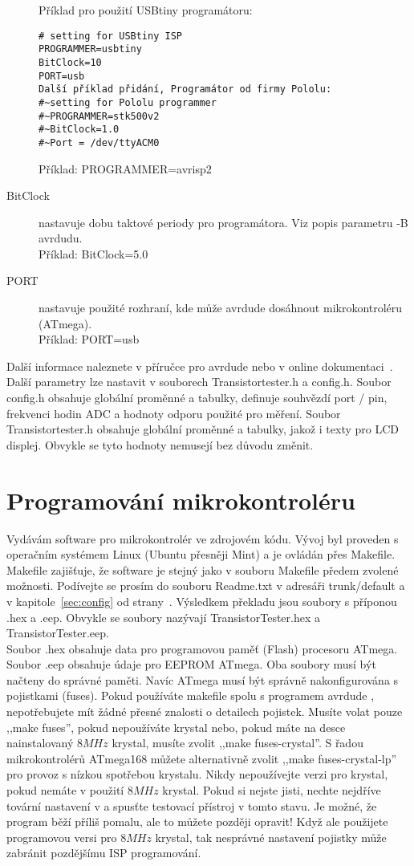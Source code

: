 \begin{description}
Příklad pro použití USBtiny programátoru:
\vspace{-1\baselineskip}
\begin{verbatim}
# setting for USBtiny ISP
PROGRAMMER=usbtiny
BitClock=10
PORT=usb
Další příklad přidání, Programátor od firmy Pololu:
#~setting for Pololu programmer
#~PROGRAMMER=stk500v2
#~BitClock=1.0
#~Port = /dev/ttyACM0
\end{verbatim}
Příklad: PROGRAMMER=avrisp2
  \item[BitClock] nastavuje dobu taktové periody pro programátora. Viz popis parametru -B avrdudu.\\
Příklad: BitClock=5.0
  \item[PORT] nastavuje použité rozhraní, kde může avrdude dosáhnout mikrokontroléru (ATmega).\\
Příklad: PORT=usb
\end{description}

Další informace naleznete v příručce pro avrdude nebo v online dokumentaci~\cite{avrdude}.
Další parametry lze nastavit v souborech Transistortester.h a config.h.
Soubor config.h obsahuje globální proměnné a tabulky, definuje souhvězdí port / pin,
frekvenci hodin ADC a hodnoty odporu použité pro měření.
Soubor Transistortester.h obsahuje globální proměnné a tabulky, jakož i texty pro LCD displej.
Obvykle se tyto hodnoty nemusejí bez důvodu změnit.
\section{Programování mikrokontroléru}
Vydávám software pro mikrokontrolér ve zdrojovém kódu.
Vývoj byl proveden s operačním systémem Linux (Ubuntu přesněji Mint) a je ovládán přes Makefile.
Makefile zajišťuje, že software je stejný jako v souboru Makefile předem zvolené možnosti.
Podívejte se prosím do souboru Readme.txt
v adresáři trunk/default a v kapitole~\ref{sec:config} od strany~\pageref{sec:config}.
Výsledkem překladu jsou soubory s příponou .hex a .eep.
Obvykle se soubory nazývají TransistorTester.hex a TransistorTester.eep.\\
Soubor .hex obsahuje data pro programovou paměť (Flash) procesoru ATmega.
Soubor .eep obsahuje údaje pro EEPROM ATmega.
Oba soubory musí být načteny do správné paměti.
Navíc ATmega musí být správně nakonfigurována s pojistkami (fuses).
Pokud používáte makefile spolu s programem avrdude \cite{avrdude}, nepotřebujete mít
žádné přesné znalosti o detailech pojistek.
Musíte volat pouze ,,make fuses'', pokud nepoužíváte krystal nebo,
pokud máte na desce nainstalovaný  \(8MHz\) krystal, musíte zvolit ,,make fuses-crystal''.
S řadou mikrokontrolérů ATmega168 můžete alternativně zvolit ,,make fuses-crystal-lp'' pro
provoz s nízkou spotřebou krystalu.
Nikdy nepoužívejte verzi pro krystal, pokud nemáte v použití \(8MHz\) krystal.
Pokud si nejste jisti, nechte nejdříve tovární nastavení v  a spusťte testovací přístroj v tomto stavu.
Je možné, že program běží příliš pomalu, ale to můžete později opravit!
Když ale použijete programovou versi pro \(8MHz\) krystal, 
tak nesprávné nastavení pojistky může zabránit pozdějšímu ISP programování.

